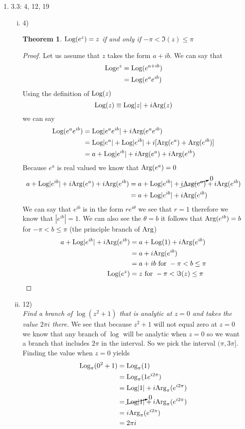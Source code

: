 \documentclass[11pt]{article}
\newcommand{\Arg}{\textnormal{Arg}}
\newcommand{\Log}{\textnormal{Log}}
\begin{document}
\begin{enumerate}
\begin{enumerate}[(i)]
\end{enumerate}
\item 3.3: 4, 12, 19
\begin{enumerate}[(i)]
\item 4)\\
\newtheorem{theo19}{Theorem}
\begin{theo19}
$\Log (e^z) = z$ if and only if $-\pi<\Im(z)\le\pi$
\end{theo19}
\begin{proof}
Let us assume that $z$ takes the form $a+ib$. We can say that
\begin{align*}
\Log e^z&=\Log(e^{a+ib})\\
&=\Log(e^{a}e^{ib})
\end{align*}
Using the definition of $\Log(z)$
$$\Log(z) \equiv \Log|z| + i\Arg(z)$$
we can say
\begin{align*}
\Log(e^{a}e^{ib})	&=\Log|e^ae^{ib}| + i\Arg(e^ae^{ib}) \\
					&=\Log|e^a|+\Log|e^{ib}| +i[\Arg(e^a)+\Arg(e^{ib})]\\
					&=a+\Log|e^{ib}|+i\Arg(e^a)+i\Arg(e^{ib})
\end{align*}
Because $e^a$ is real valued we know that $\Arg(e^a)=0$ 
\begin{align*}
a+\Log|e^{ib}|+i\Arg(e^a)+i\Arg(e^{ib}) &= a+\Log|e^{ib}| +\cancelto{0}{i\Arg(e^a)}+i\Arg(e^{ib})\\
			 &= a+\Log|e^{ib}| +i\Arg(e^{ib})
\end{align*}
We can say that $e^{ib}$ is in the form $re^{i\theta}$ we see that $r=1$ therefore we know that $|e^{ib}| = 1$. We can also see the $\theta = b$ it follows that $\Arg(e^{ib}) = b$ for $-\pi<b\le\pi$ (the principle branch of $\Arg$)
\begin{align*}
a+\Log|e^{ib}| +i\Arg(e^{ib}) &= a+\Log(1) +i\Arg(e^{ib})\\
	&=a+i\Arg(e^{ib})\\
	&=a+ib \mbox{ for } -\pi<b\le\pi\\
\Log (e^z)&=z \mbox{ for } -\pi<\Im(z)\le\pi
\end{align*}
\end{proof}

\item 12)\\
\textit{Find a branch of $\log(z^2+1)$ that is analytic at $z=0$ and takes the value $2\pi i$ there.}
We see that because $z^2+1$ will not equal zero at $z=0$ we know that any branch of $\log$ will be analytic when $z=0$ so we want a branch that includes $2\pi$ in the interval. So we pick the interval $(\pi,3\pi]$. Finding the value when $z=0$ yields
\begin{align*}
\Log_{\pi}(0^2+1) &= \Log_{\pi}(1)\\
&= \Log_{\pi}(1e^{i2\pi})\\
&=\Log|1|+i\Arg_{\pi}(e^{i2\pi})\\
&=\cancelto{0}{\Log|1|}+i\Arg_{\pi}(e^{i2\pi})\\
&=i\Arg_{\pi}(e^{i2\pi})\\
&=2\pi i
\end{align*}


\end{enumerate}
\end{enumerate}
\end{document}
